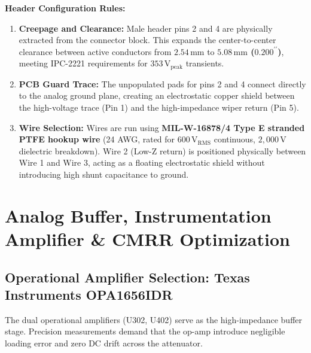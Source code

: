 \documentclass[11pt, letterpaper]{article}
\begin{document}
\textbf{Header Configuration Rules:}
\begin{enumerate}[label=\textbf{\arabic*.}]
    \item \textbf{Creepage and Clearance:} Male header pins 2 and 4 are physically extracted from the connector block. This expands the center-to-center clearance between active conductors from $2.54\,\text{mm}$ to \textbf{$5.08\,\text{mm}$ ($0.200^{\prime\prime}$)}, meeting IPC-2221 requirements for $353\,\text{V}_{\text{peak}}$ transients.
    \item \textbf{PCB Guard Trace:} The unpopulated pads for pins 2 and 4 connect directly to the analog ground plane, creating an electrostatic copper shield between the high-voltage trace (Pin 1) and the high-impedance wiper return (Pin 5).
    \item \textbf{Wire Selection:} Wires are run using \textbf{MIL-W-16878/4 Type E stranded PTFE hookup wire} (24 AWG, rated for $600\,\text{V}_{\text{RMS}}$ continuous, $2,000\,\text{V}$ dielectric breakdown). Wire 2 (Low-Z return) is positioned physically between Wire 1 and Wire 3, acting as a floating electrostatic shield without introducing high shunt capacitance to ground.
\end{enumerate}

\section{Analog Buffer, Instrumentation Amplifier \& CMRR Optimization}

\subsection{Operational Amplifier Selection: Texas Instruments OPA1656IDR}
The dual operational amplifiers (U302, U402) serve as the high-impedance buffer stage. Precision measurements demand that the op-amp introduce negligible loading error and zero DC drift across the attenuator.
\end{document}
